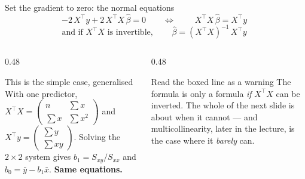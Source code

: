\documentclass[aspectratio=169]{beamer}
\newcommand{\Xt}{X^{\!\top}}
\begin{document}
\begin{frame}[shrink=6]{Set the gradient to zero: the normal equations}
  \[
    -2\,\Xt y + 2\,\Xt X\,\hat\beta = 0
    \qquad\Longleftrightarrow\qquad
    \boxed{\;\Xt X\,\hat\beta = \Xt y\;}
  \]
  \vspace{-0.4em}
  \[
    \text{and if } \Xt X \text{ is invertible,}\qquad
    \boxed{\;\hat\beta = (\Xt X)^{-1}\,\Xt y\;}
  \]
  \begin{columns}[T]
    \begin{column}{0.48\textwidth}
      \begin{block}{This is the simple case, generalised}
        \small With one predictor,
        $\Xt X = \left(\begin{smallmatrix} n & \sum x\\
        \sum x & \sum x^2\end{smallmatrix}\right)$ and
        $\Xt y = \left(\begin{smallmatrix}\sum y\\
        \sum xy\end{smallmatrix}\right)$. Solving the
        $2\times2$ system gives $b_1 = S_{xy}/S_{xx}$ and
        $b_0 = \bar y - b_1\bar x$. \textbf{Same equations.}
      \end{block}
    \end{column}
    \begin{column}{0.48\textwidth}
      \begin{alertblock}{Read the boxed line as a warning}
        \small The formula is only a formula \emph{if} $\Xt X$ can be
        inverted. The whole of the next slide is about when it cannot ---
        and multicollinearity, later in the lecture, is the case where it
        \emph{barely} can.
      \end{alertblock}
    \end{column}
  \end{columns}
\end{frame}
\end{document}
